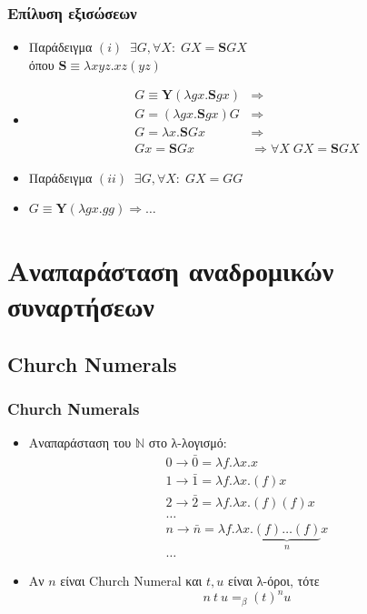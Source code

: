 \documentclass{beamer}
\begin{document}
\begin{frame}
\frametitle{Επίλυση εξισώσεων}
\begin{itemize}
\item Παράδειγμα $(i) \; \; \exists G, \forall X: \; G X = \textbf{S} G X $ \\
όπου $ \textbf{S} \equiv \lambda x y z . x z (y z) $ \pause
\item $$ \begin{array}{ll}
                G \equiv \textbf{Y} (\lambda g x. \textbf{S} g x) & \Rightarrow  \\
                G = (\lambda g x. \textbf{S} g x) G & \Rightarrow  \\
                G = \lambda x . \textbf{S} G x & \Rightarrow  \\
                G x = \textbf{S} G x & \Rightarrow \forall X \; G X = \textbf{S} G X
      \end{array} $$  \pause
\item   Παράδειγμα $(ii) \; \; \exists G, \forall X: \; G X = G G $ \pause
\item $ G \equiv \textbf{Y} (\lambda g x. g g) \Rightarrow \ldots $
\end{itemize}
\end{frame}

\section{Αναπαράσταση αναδρομικών συναρτήσεων}

\subsection{Church Numerals}

\begin{frame}
        \frametitle{Church Numerals}
        \begin{itemize}
                \item Αναπαράσταση του $ \mathbb{N} $ στο λ-λογισμό:
                \pause
	        	$$ \begin{array}{l}
	        		0 \rightarrow \bar{0} = \lambda f . \lambda x . x \\
	        		1 \rightarrow \bar{1} = \lambda f . \lambda x . (f) x \\
	        		2 \rightarrow \bar{2} = \lambda f . \lambda x . (f) (f) x \\
	        		\ldots \\
	        		n \rightarrow \bar{n} = \lambda f . \lambda x . \underbrace{(f) \ldots (f)}_n x \\
	        		\ldots
	        	\end{array} $$
	        	\pause
                \item Αν $n $ είναι Church Numeral και $t, u$ είναι λ-όροι, τότε
                $$ n\:t\:u =_\beta (t)^n u $$
        \end{itemize}
\end{frame}
\end{document}
